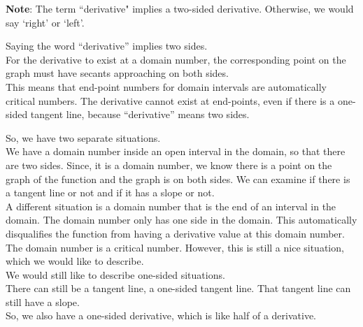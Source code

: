 \documentclass{ximera}
\begin{document}
\textbf{Note}: The term ``derivative" implies a two-sided derivative.  Otherwise, we would say `right' or `left'. \\




\begin{warning}

Saying the word ``derivative'' implies two sides. \\

For the derivative to exist at a domain number, the corresponding point on the graph must have secants approaching on both sides. \\


This means that end-point numbers for domain intervals are automatically critical numbers.  The derivative cannot exist at end-points, even if there is a one-sided tangent line, because ``derivative'' means two sides. \\

\end{warning}




So, we have two separate situations. \\


We have a domain number inside an open interval in the domain, so that there are two sides. Since, it is a domain number, we know there is a point on the graph of the function and the graph is on both sides.  We can examine if there is a tangent line or not and if it has a slope or not. \\

A different situation is a domain number that is the end of an interval in the domain.  The domain number only has one side in the domain.  This automatically disqualifies the function from having a derivative value at this domain number.  The domain number is a critical number.  However, this is still a nice situation, which we would like to describe. \\

We would still like to describe one-sided situations. \\

There can still be a tangent line, a one-sided tangent line. That tangent line can still have a slope. \\

So, we also have a one-sided derivative, which is like half of a derivative. \\
\end{document}
